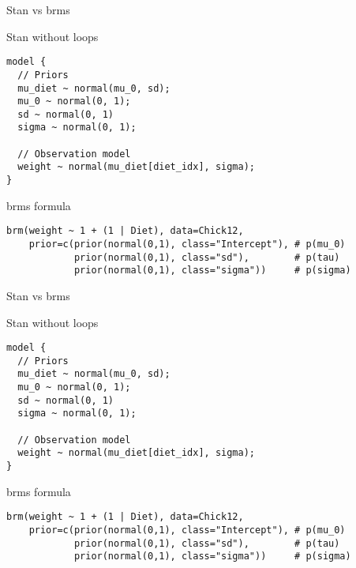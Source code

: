 \documentclass[finnish,english,t]{beamer}
\begin{document}
\begin{frame}[fragile]{Stan vs brms}

  \vspace{-0.5\baselineskip}

  Stan without loops
  
{\small
\begin{verbatim}
model {
  // Priors
  mu_diet ~ normal(mu_0, sd);
  mu_0 ~ normal(0, 1);
  sd ~ normal(0, 1)
  sigma ~ normal(0, 1);
  
  // Observation model
  weight ~ normal(mu_diet[diet_idx], sigma);
}
\end{verbatim}

  brms formula
\begin{verbatim}
brm(weight ~ 1 + (1 | Diet), data=Chick12,
    prior=c(prior(normal(0,1), class="Intercept"), # p(mu_0)
            prior(normal(0,1), class="sd"),        # p(tau)
            prior(normal(0,1), class="sigma"))     # p(sigma)
\end{verbatim}
}

\end{frame}

\begin{frame}[fragile]{Stan vs brms}

  \vspace{-0.5\baselineskip}

  Stan without loops
  
{\small
\begin{verbatim}
model {
  // Priors
  mu_diet ~ normal(mu_0, sd);
  mu_0 ~ normal(0, 1);
  sd ~ normal(0, 1)
  sigma ~ normal(0, 1);
  
  // Observation model
  weight ~ normal(mu_diet[diet_idx], sigma);
}
\end{verbatim}

  brms formula
\begin{verbatim}
brm(weight ~ 1 + (1 | Diet), data=Chick12,
    prior=c(prior(normal(0,1), class="Intercept"), # p(mu_0)
            prior(normal(0,1), class="sd"),        # p(tau)
            prior(normal(0,1), class="sigma"))     # p(sigma)
\end{verbatim}
}

\end{frame}

\end{document}
